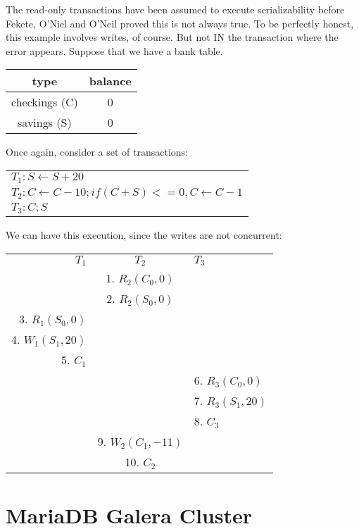 The read-only transactions have been assumed to execute serializability before Fekete, O'Niel and O'Neil proved this is not always true\cite{DBLP:journals/sigmod/FeketeOO04}.
To be perfectly honest, this example involves writes, of course. But not IN the transaction where the error appears. Suppose that we have a bank table.

\begin{table}[H]
  \centering
  \begin{tabular}{ c | c }
    type & balance \\
    \hline
    checkings (C) & 0 \\
    savings (S) & 0 \\
  \end{tabular}
\end{table}

Once again, consider a set of transactions:
\begin{table}[H]
  \centering
  \begin{tabular}{ l }
    $T_1:   S \gets S + 20 $\\
    $T_2:   C \gets C -10 ; if (C+S) <= 0, C \gets C -1 $\\
    $T_3:   C ; S$\\
  \end{tabular}
\end{table}

We can have this execution, since the writes are not concurrent:

\begin{table}[H]
  \centering
  \begin{tabular}{ r | c | l }
    $T_1$ & $T_2$ & $T_3$ \\
    & 1. $R_2(C_0,0)$ & \\
    & 2. $R_2(S_0,0)$ & \\
    3. $R_1(S_0,0)$ & & \\
    4. $W_1(S_1,20)$ & & \\
    5. $C_1$ & & \\
    & & 6. $R_3(C_0,0)$ \\
    & & 7. $R_3(S_1,20)$ \\
    & & 8. $C_3$\\
    & 9. $W_2(C_1,-11)$ & \\
    & 10. $C_2$ & \\
  \end{tabular}
\end{table}

\section{MariaDB Galera Cluster}

